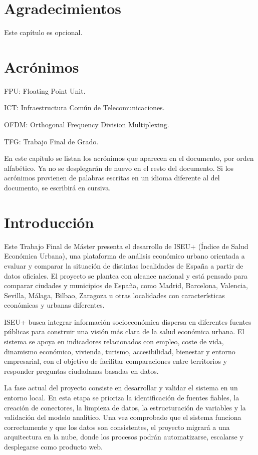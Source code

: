 \chapter*{Agradecimientos}

Este capítulo es opcional.

\chapter*{Acrónimos}

FPU: Floating Point Unit.

ICT: Infraestructura Común de Telecomunicaciones.

OFDM: Orthogonal Frequency Division Multiplexing.

TFG: Trabajo Final de Grado.

En este capítulo se listan los acrónimos que aparecen en el documento, por orden alfabético. Ya no se desplegarán de nuevo en el resto del documento. Si los acrónimos provienen de palabras escritas en un idioma diferente al del documento, se escribirá en cursiva.

\chapter{Introducción}

Este Trabajo Final de Máster presenta el desarrollo de ISEU+ (Índice de Salud Económica Urbana), una plataforma de análisis económico urbano orientada a evaluar y comparar la situación de distintas localidades de España a partir de datos oficiales. El proyecto se plantea con alcance nacional y está pensado para comparar ciudades y municipios de España, como Madrid, Barcelona, Valencia, Sevilla, Málaga, Bilbao, Zaragoza u otras localidades con características económicas y urbanas diferentes.

ISEU+ busca integrar información socioeconómica dispersa en diferentes fuentes públicas para construir una visión más clara de la salud económica urbana. El sistema se apoya en indicadores relacionados con empleo, coste de vida, dinamismo económico, vivienda, turismo, accesibilidad, bienestar y entorno empresarial, con el objetivo de facilitar comparaciones entre territorios y responder preguntas ciudadanas basadas en datos.

La fase actual del proyecto consiste en desarrollar y validar el sistema en un entorno local. En esta etapa se prioriza la identificación de fuentes fiables, la creación de conectores, la limpieza de datos, la estructuración de variables y la validación del modelo analítico. Una vez comprobado que el sistema funciona correctamente y que los datos son consistentes, el proyecto migrará a una arquitectura en la nube, donde los procesos podrán automatizarse, escalarse y desplegarse como producto web.

